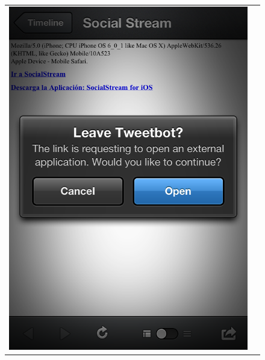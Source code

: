 \begin{figure}[H]
	\centering
	\begin{tabular}{cc}
	\includegraphics[scale=0.28]{imgs/tweetbot-sstream.png} &

\end{tabular}
\end{figure}

